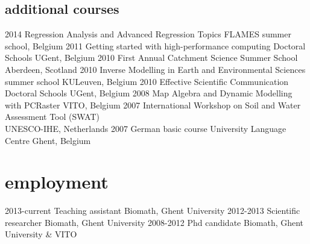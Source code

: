 \documentclass[]{stvhoey-cv}  %
\begin{document}
\subsection*{additional courses}
\begin{entrylist}
  \shortentry
    {2014}
    {Regression Analysis and Advanced Regression Topics}
    {FLAMES summer school, Belgium}
  \shortentry
    {2011}
    {Getting started with high-performance computing}
    {Doctoral Schools UGent, Belgium}
  \shortentry
    {2010}
    {First Annual Catchment Science Summer School}
    {Aberdeen, Scotland}
  \shortentry
    {2010}
    {Inverse Modelling in Earth and Environmental Sciences}
    {summer school KULeuven, Belgium}
  \shortentry
    {2010}
    {Effective Scientific Communication}
    {Doctoral Schools UGent, Belgium}
  \shortentry
    {2008}
    {Map Algebra and Dynamic Modelling with PCRaster}
    {VITO, Belgium}
  \shortentry
    {2007}
    {International Workshop on Soil and Water Assessment Tool (SWAT)\\ }
    {UNESCO-IHE, Netherlands}
  \shortentry
    {2007}
    {German basic course}
    {University Language Centre Ghent, Belgium}
\end{entrylist}

 \vspace{\baselineskip}
\section{employment}
\begin{entrylist}
  \shortentry
    {2013-current}
    {Teaching assistant}
    {Biomath, Ghent University}
  \shortentry
    {2012-2013}
    {Scientific researcher}
    {Biomath, Ghent University}
  \shortentry
    {2008-2012}
    {Phd candidate}
    {Biomath, Ghent University \& VITO}
\end{entrylist}
\end{document}
